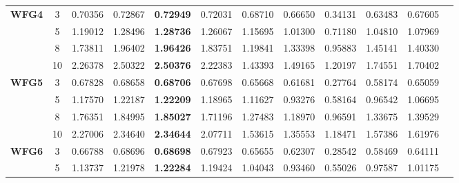 \documentclass{sig-alternate}
\begin{document}
\begin{table}[!htb]
\begin{tabular}{|c|c|c|c|c|c|c|c|c|c|c|c|}
\multirow{4}{*}{\textbf{WFG4}}  & 3          & 0.70356          & 0.72867           & \textbf{0.72949}      & 0.72031          & 0.68710             & 0.66650             & 0.34131            & 0.63483              & 0.67605          \\ \cline{2-11} 
& 5          & 1.19012          & 1.28496           & \textbf{1.28736}      & 1.26067          & 1.15695             & 1.01300             & 0.71180            & 1.04810              & 1.07969          \\ \cline{2-11} 
& 8          & 1.73811          & 1.96402           & \textbf{1.96426}      & 1.83751          & 1.19841             & 1.33398             & 0.95883            & 1.45141              & 1.40330          \\ \cline{2-11} 
& 10         & 2.26378          & 2.50322           & \textbf{2.50376}      & 2.22383          & 1.43393             & 1.49165             & 1.20197            & 1.74551              & 1.70402          \\ \hline
\multirow{4}{*}{\textbf{WFG5}}  & 3          & 0.67828          & 0.68658           & \textbf{0.68706}      & 0.67698          & 0.65668             & 0.61681             & 0.27764            & 0.58174              & 0.65059          \\ \cline{2-11} 
& 5          & 1.17570          & 1.22187           & \textbf{1.22209}      & 1.18965          & 1.11627             & 0.93276             & 0.58164            & 0.96542              & 1.06695          \\ \cline{2-11} 
& 8          & 1.76351          & 1.84995           & \textbf{1.85027}      & 1.71196          & 1.27483             & 1.18970             & 0.96591            & 1.33675              & 1.39529          \\ \cline{2-11} 
& 10         & 2.27006          & 2.34640           & \textbf{2.34644}      & 2.07711          & 1.53615             & 1.35553             & 1.18471            & 1.57386              & 1.61976          \\ \hline
\multirow{4}{*}{\textbf{WFG6}}  & 3          & 0.66788          & 0.68696           & \textbf{0.68698}      & 0.67923          & 0.65655             & 0.62307             & 0.28542            & 0.58469              & 0.64111          \\ \cline{2-11} 
& 5          & 1.13737          & 1.21978           & \textbf{1.22284}      & 1.19424          & 1.04043             & 0.93460             & 0.55026            & 0.97587              & 1.01175          \\ \cline{2-11} 

\end{tabular}
\end{table}
\end{document}
